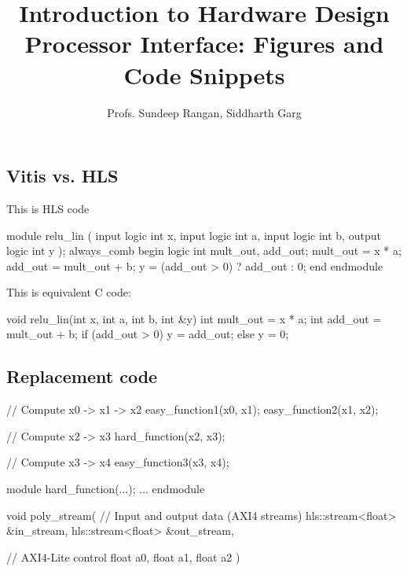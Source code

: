 \documentclass[11pt]{article}
\begin{document}
\title{Introduction to Hardware Design\\
Processor Interface:  Figures and Code Snippets}
\author{Profs. Sundeep Rangan, Siddharth Garg}
\date{}

\maketitle
\subsection{Vitis vs. HLS}

This is HLS code
\begin{systemverilogcode}
    module relu_lin (
      input logic int x,
      input logic int a,
      input logic int b,
      output logic int y
    );
      always_comb begin
        logic int mult_out, add_out;
        mult_out = x * a;
        add_out = mult_out + b;
        y = (add_out > 0) ? add_out : 0;
      end
    endmodule
  \end{systemverilogcode}

  This is equivalent C code:
  \begin{ccode}
    void relu_lin(int x, int a, int b, int &y) {
      int mult_out = x * a;
      int add_out = mult_out + b;
      if (add_out > 0) {
        y = add_out;
      } else {
        y = 0;
      }
    }
  \end{ccode}

  \subsection{Replacement code}
  \begin{ccode}
    // Compute x0 -> x1 -> x2
    easy_function1(x0, x1);  
    easy_function2(x1, x2); 

    // Compute x2 -> x3
    hard_function(x2, x3);  

    // Compute x3 -> x4
    easy_function3(x3, x4); 
  \end{ccode}

  \begin{systemverilogcode}
  module hard_function(...);
     ... 
  endmodule
  \end{systemverilogcode}

  \pagebreak
  \begin{ccode}
  void poly_stream(
      // Input and output data (AXI4 streams)
      hls::stream<float> &in_stream,
      hls::stream<float> &out_stream,

      // AXI4-Lite control
      float a0,
      float a1,
      float a2
  ) 
  \end{ccode}
  
\end{document}
